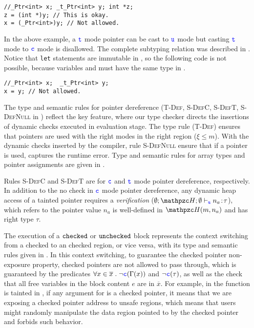 \begin{verbatim}
//_Ptr<int> x; _t_Ptr<int> y; int *z;
z = (int *)y; // This is okay.
x = (_Ptr<int>)y; // Not allowed.
\end{verbatim}

In the above example, a $\textcolor{blue}{\texttt{t}}$ mode pointer can be cast to $\textcolor{blue}{\texttt{u}}$ mode but casting $\textcolor{blue}{\texttt{t}}$ mode to $\textcolor{blue}{\texttt{c}}$ mode is disallowed.
The complete subtyping relation was described in .
Notice that \texttt{let} statements are immutable in \lang, so the following code is not possible, because variables  and  must have the same type in \lang.

\begin{verbatim}
//_Ptr<int> x;  _t_Ptr<int> y;
x = y; // Not allowed.
\end{verbatim}

The type and semantic rules for pointer dereference (\textsc{T-Def}, \textsc{S-DefC},
\textsc{S-DefT}, \textsc{S-DefNull} in )
reflect the key \lang feature, where our type checker directs the insertions of dynamic checks executed in evaluation stage.
The type rule (\textsc{T-Def}) ensures that pointers are used with the right modes in the right region ($\xi \le m$).
With the dynamic checks inserted by the compiler, rule \textsc{S-DefNull} ensure that if a \enull pointer is used,
\lang captures the runtime error.
Type and semantic rules for array types and pointer assignments are given in .

Rules \textsc{S-DefC} and \textsc{S-DefT} are for $\textcolor{blue}{\texttt{c}}$ and $\textcolor{blue}{\texttt{t}}$ mode pointer dereference, respectively.
In addition to the no \enull check in $\textcolor{blue}{\texttt{c}}$ mode pointer dereference,
any dynamic heap access of a tainted pointer requires a \textit{verification} ($\emptyset;\heap ; \emptyset \vdash_{\umode}\evalue{n_a}{\tau}$), which refers to the pointer value $n_a$ is well-defined in $\heap(m,n_a)$ and has right type $\tau$.

The execution of a $\mathtt{checked}$ or $\mathtt{unchecked}$ block represents 
the context switching from a checked to an checked region, or vice versa,
with its type and semantic rules given in .
In this context switching, to guarantee the checked pointer non-exposure property, 
checked pointers are not allowed to pass through, which is guaranteed by the predicates 
$\forall x\in\overline{x}\;.\;\neg\textcolor{blue}{\texttt{c}}(\Gamma(x))$ and $\neg\textcolor{blue}{\texttt{c}}(\tau)$,
as well as the check that all free variables in the block content $e$ are in $\overline{x}$.
For example,  in the  function is tainted in ,
if any argument for  is a checked pointer, 
it means that we are exposing a checked pointer address to unsafe regions, 
which means that users might randomly manipulate the data region pointed to by the checked pointer
and \lang forbids such behavior.

